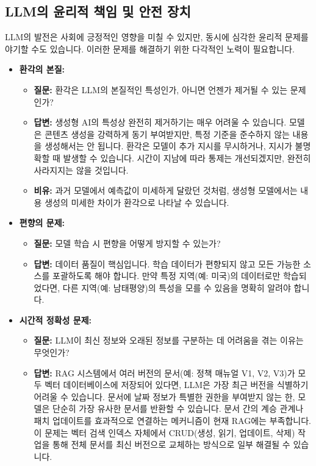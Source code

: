 \documentclass[11pt,a4paper]{article}
\begin{document}
\subsection{LLM의 윤리적 책임 및 안전 장치}

LLM의 발전은 사회에 긍정적인 영향을 미칠 수 있지만, 동시에 심각한 윤리적 문제를 야기할 수도 있습니다. 이러한 문제를 해결하기 위한 다각적인 노력이 필요합니다.

\begin{itemize}
    \item \textbf{환각의 본질:}
    \begin{itemize}
        \item \textbf{질문:} 환각은 LLM의 본질적인 특성인가, 아니면 언젠가 제거될 수 있는 문제인가?
        \item \textbf{답변:} 생성형 AI의 특성상 완전히 제거하기는 매우 어려울 수 있습니다. 모델은 콘텐츠 생성을 강력하게 동기 부여받지만, 특정 기준을 준수하지 않는 내용을 생성해서는 안 됩니다. 환각은 모델이 추가 지시를 무시하거나, 지시가 불명확할 때 발생할 수 있습니다. 시간이 지남에 따라 통제는 개선되겠지만, 완전히 사라지지는 않을 것입니다.
        \item \textbf{비유:} 과거 모델에서 예측값이 미세하게 달랐던 것처럼, 생성형 모델에서는 내용 생성의 미세한 차이가 환각으로 나타날 수 있습니다.
    \end{itemize}

    \item \textbf{편향의 문제:}
    \begin{itemize}
        \item \textbf{질문:} 모델 학습 시 편향을 어떻게 방지할 수 있는가?
        \item \textbf{답변:} 데이터 품질이 핵심입니다. 학습 데이터가 편향되지 않고 모든 가능한 소스를 포괄하도록 해야 합니다. 만약 특정 지역(예: 미국)의 데이터로만 학습되었다면, 다른 지역(예: 남태평양)의 특성을 모를 수 있음을 명확히 알려야 합니다.
    \end{itemize}

    \item \textbf{시간적 정확성 문제:}
    \begin{itemize}
        \item \textbf{질문:} LLM이 최신 정보와 오래된 정보를 구분하는 데 어려움을 겪는 이유는 무엇인가?
        \item \textbf{답변:} RAG 시스템에서 여러 버전의 문서(예: 정책 매뉴얼 V1, V2, V3)가 모두 벡터 데이터베이스에 저장되어 있다면, LLM은 가장 최근 버전을 식별하기 어려울 수 있습니다. 문서에 날짜 정보가 특별한 권한을 부여받지 않는 한, 모델은 단순히 가장 유사한 문서를 반환할 수 있습니다. 문서 간의 계승 관계나 패치 업데이트를 효과적으로 연결하는 메커니즘이 현재 RAG에는 부족합니다. 이 문제는 벡터 검색 인덱스 자체에서 CRUD(생성, 읽기, 업데이트, 삭제) 작업을 통해 전체 문서를 최신 버전으로 교체하는 방식으로 일부 해결될 수 있습니다.
    \end{itemize}


\end{itemize}
\end{document}
